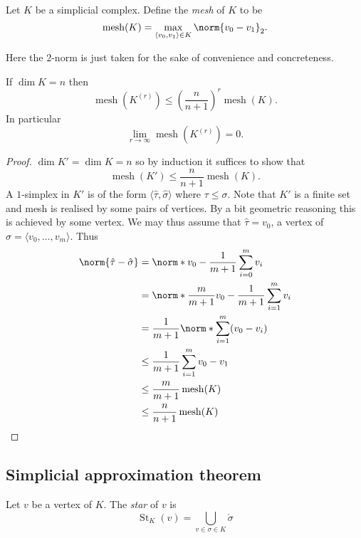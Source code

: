 \documentclass[a4paper]{article}
\newcommand{\interior}{\mathring} %
\DeclareMathOperator{\mesh}{mesh}
\DeclareMathOperator{\St}{St} %
\begin{document}
\begin{definition}[mesh]
  Let \(K\) be a simplicial complex. Define the \emph{mesh} of \(K\) to be
  \[
    \mesh(K) = \max_{\langle v_0, v_1 \rangle \in K} \norm{v_0 - v_1}_2.
  \]
\end{definition}

Here the \(2\)-norm is just taken for the sake of convenience and concreteness.

\begin{lemma}
  If \(\dim K = n\) then
  \[
    \mesh(K^{(r)}) \leq \left(\frac{n}{n + 1}\right)^r \mesh(K).
  \]
  In particular
  \[
    \lim_{r \to \infty} \mesh(K^{(r)}) = 0.
  \]
\end{lemma}

\begin{proof}
  \(\dim K' = \dim K = n\) so by induction it suffices to show that
  \[
    \mesh(K') \leq \frac{n}{n + 1} \mesh(K).
  \]
  A \(1\)-simplex in \(K'\) is of the form \(\langle \hat \tau, \hat \sigma \rangle\) where \(\tau \leq \sigma\). Note that \(K'\) is a finite set and mesh is realised by some pairs of vertices. By a bit geometric reasoning this is achieved by some vertex. We may thus assume that \(\hat \tau = v_0\), a vertex of \(\sigma = \langle v_0, \dots, v_m\rangle\). Thus
  \begin{align*}
    \norm{\hat \tau - \hat \sigma}
    &= \norm*{v_0 - \frac{1}{m + 1} \sum_{i = 0}^m v_i} \\
    &= \norm*{\frac{m}{m + 1} v_0 - \frac{1}{m + 1} \sum_{i = 1}^m v_i} \\
    &= \frac{1}{m + 1} \norm*{\sum_{i = 1}^m (v_0 - v_i)} \\
    &\leq \frac{1}{m + 1} \sum_{i = 1}^m{v_0 - v_1} \\
    &\leq \frac{m}{m + 1} \mesh(K) \\
    &\leq \frac{n}{n + 1} \mesh (K)
  \end{align*}
\end{proof}

\subsection{Simplicial approximation theorem}

\begin{definition}[star]
  Let \(v\) be a vertex of \(K\). The \emph{star} of \(v\) is
  \[
    \St_K(v) = \bigcup_{v \in \sigma \in K} \interior \sigma
  \]
\end{definition}
\end{document}
